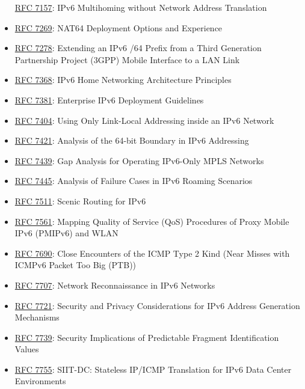 \documentclass[
]{article}
\begin{document}
\begin{itemize}
  \href{https://www.rfc-editor.org/info/rfc7157}{RFC 7157}: IPv6
  Multihoming without Network Address Translation
\item
  \href{https://www.rfc-editor.org/info/rfc7269}{RFC 7269}: NAT64
  Deployment Options and Experience
\item
  \href{https://www.rfc-editor.org/info/rfc7278}{RFC 7278}: Extending an
  IPv6 /64 Prefix from a Third Generation Partnership Project (3GPP)
  Mobile Interface to a LAN Link
\item
  \href{https://www.rfc-editor.org/info/rfc7368}{RFC 7368}: IPv6 Home
  Networking Architecture Principles
\item
  \href{https://www.rfc-editor.org/info/rfc7381}{RFC 7381}: Enterprise
  IPv6 Deployment Guidelines
\item
  \href{https://www.rfc-editor.org/info/rfc7404}{RFC 7404}: Using Only
  Link-Local Addressing inside an IPv6 Network
\item
  \href{https://www.rfc-editor.org/info/rfc7421}{RFC 7421}: Analysis of
  the 64-bit Boundary in IPv6 Addressing
\item
  \href{https://www.rfc-editor.org/info/rfc7439}{RFC 7439}: Gap Analysis
  for Operating IPv6-Only MPLS Networks
\item
  \href{https://www.rfc-editor.org/info/rfc7445}{RFC 7445}: Analysis of
  Failure Cases in IPv6 Roaming Scenarios
\item
  \href{https://www.rfc-editor.org/info/rfc7511}{RFC 7511}: Scenic
  Routing for IPv6
\item
  \href{https://www.rfc-editor.org/info/rfc7561}{RFC 7561}: Mapping
  Quality of Service (QoS) Procedures of Proxy Mobile IPv6 (PMIPv6) and
  WLAN
\item
  \href{https://www.rfc-editor.org/info/rfc7690}{RFC 7690}: Close
  Encounters of the ICMP Type 2 Kind (Near Misses with ICMPv6 Packet Too
  Big (PTB))
\item
  \href{https://www.rfc-editor.org/info/rfc7707}{RFC 7707}: Network
  Reconnaissance in IPv6 Networks
\item
  \href{https://www.rfc-editor.org/info/rfc7721}{RFC 7721}: Security and
  Privacy Considerations for IPv6 Address Generation Mechanisms
\item
  \href{https://www.rfc-editor.org/info/rfc7739}{RFC 7739}: Security
  Implications of Predictable Fragment Identification Values
\item
  \href{https://www.rfc-editor.org/info/rfc7755}{RFC 7755}: SIIT-DC:
  Stateless IP/ICMP Translation for IPv6 Data Center Environments

\end{itemize}
\end{document}
